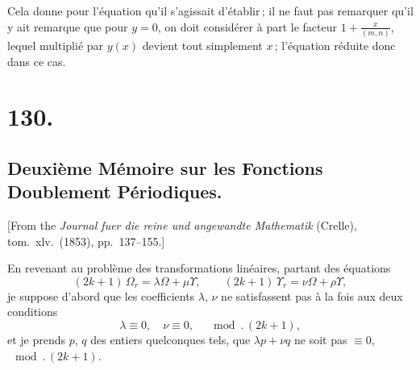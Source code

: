 \documentclass[11pt,a4paper]{book}
\begin{document}
\medskip

Cela donne pour l'\'equation qu'il s'agissait d'\'etablir\,; il ne faut pas remarquer qu'il y
ait remarque que pour $y = 0$, on doit consid\'erer \`a part le facteur $1+\tfrac{x}{(m,n)}$, lequel
multipli\'e par $y(x)$ devient tout simplement $x$\,; l'\'equation r\'eduite donc dans ce cas.
\clearpage


\section*{130.}
\subsection*{Deuxi\`eme M\'emoire sur les Fonctions Doublement P\'eriodiques.}

[From the \textit{Journal fuer die reine und angewandte Mathematik} (Crelle),
tom.\ xlv.\ (1853), pp.\ 137--155.]

\medskip

En revenant au probl\`eme des transformations lin\'eaires, partant des \'equations
\[
(2k+1)\,\Omega_r = \lambda\Omega + \mu\Upsilon,
\qquad
(2k+1)\,\Upsilon_r = \nu\Omega + \rho\Upsilon,
\]
je suppose d'abord que les coefficients $\lambda$, $\nu$ ne satisfassent pas
\`a la fois aux deux conditions
\[
\lambda \equiv 0,\quad \nu \equiv 0, \quad \mod.\,(2k+1),
\]
et je prends $p$, $q$ des entiers quelconques tels, que $\lambda p + \nu q$
ne soit pas $\equiv 0$, $\mod.\,(2k+1)$.
\end{document}
